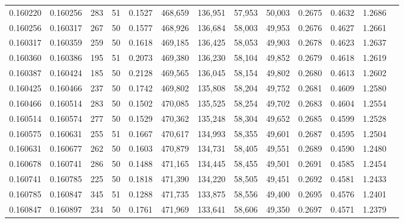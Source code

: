 \begin{tabular}{rrrrrrrrrrrrr}
0.160220 & 0.160256 &   283 &  51 &                                     0.1527 & 468,659 & 136,951 &  57,953 &  50,003 & 0.2675 & 0.4632 & 1.2686 \\
0.160256 & 0.160317 &   267 &  50 &                                     0.1577 & 468,926 & 136,684 &  58,003 &  49,953 & 0.2676 & 0.4627 & 1.2661 \\
0.160317 & 0.160359 &   259 &  50 &                                     0.1618 & 469,185 & 136,425 &  58,053 &  49,903 & 0.2678 & 0.4623 & 1.2637 \\
0.160360 & 0.160386 &   195 &  51 &                                     0.2073 & 469,380 & 136,230 &  58,104 &  49,852 & 0.2679 & 0.4618 & 1.2619 \\
0.160387 & 0.160424 &   185 &  50 &                                     0.2128 & 469,565 & 136,045 &  58,154 &  49,802 & 0.2680 & 0.4613 & 1.2602 \\
0.160425 & 0.160466 &   237 &  50 &                                     0.1742 & 469,802 & 135,808 &  58,204 &  49,752 & 0.2681 & 0.4609 & 1.2580 \\
0.160466 & 0.160514 &   283 &  50 &                                     0.1502 & 470,085 & 135,525 &  58,254 &  49,702 & 0.2683 & 0.4604 & 1.2554 \\
0.160514 & 0.160574 &   277 &  50 &                                     0.1529 & 470,362 & 135,248 &  58,304 &  49,652 & 0.2685 & 0.4599 & 1.2528 \\
0.160575 & 0.160631 &   255 &  51 &                                     0.1667 & 470,617 & 134,993 &  58,355 &  49,601 & 0.2687 & 0.4595 & 1.2504 \\
0.160631 & 0.160677 &   262 &  50 &                                     0.1603 & 470,879 & 134,731 &  58,405 &  49,551 & 0.2689 & 0.4590 & 1.2480 \\
0.160678 & 0.160741 &   286 &  50 &                                     0.1488 & 471,165 & 134,445 &  58,455 &  49,501 & 0.2691 & 0.4585 & 1.2454 \\
0.160741 & 0.160785 &   225 &  50 &                                     0.1818 & 471,390 & 134,220 &  58,505 &  49,451 & 0.2692 & 0.4581 & 1.2433 \\
0.160785 & 0.160847 &   345 &  51 &                                     0.1288 & 471,735 & 133,875 &  58,556 &  49,400 & 0.2695 & 0.4576 & 1.2401 \\
0.160847 & 0.160897 &   234 &  50 &                                     0.1761 & 471,969 & 133,641 &  58,606 &  49,350 & 0.2697 & 0.4571 & 1.2379 \\

\end{tabular}
